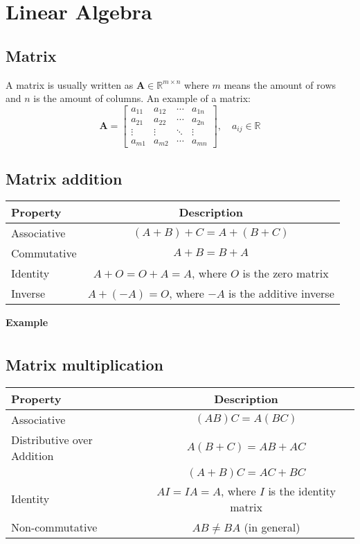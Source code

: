 \section{Linear Algebra}

\subsection{Matrix}
A matrix is usually written as $\mathbf{A} \in \mathbb{R}^{m \times n}$ where $m$ means the amount of rows and $n$ is the amount of columns. An example of a matrix:
$$
\mathbf{A} =
\begin{bmatrix}
    a_{11} & a_{12} & \cdots & a_{1n} \\
    a_{21} & a_{22} & \cdots & a_{2n} \\
    \vdots & \vdots & \ddots & \vdots \\
    a_{m1} & a_{m2} & \cdots & a_{mn}
\end{bmatrix},
\quad a_{ij} \in \mathbb{R}
$$

\subsection{Matrix addition}
\begin{center}
\begin{tabular}{|l|c|}
    \hline
    \textbf{Property} & \textbf{Description} \\ \hline
    Associative & \((A + B) + C = A + (B + C)\) \\ \hline
    Commutative & \(A + B = B + A\) \\ \hline
    Identity & \(A + O = O + A = A\), where \(O\) is the zero matrix \\ \hline
    Inverse & \(A + (-A) = O\), where \(-A\) is the additive inverse \\ \hline
\end{tabular}
\end{center}

\textbf{Example}
\begin{align*}
\end{align*}

\subsection{Matrix multiplication}
\begin{center}
\begin{tabular}{|l|c|}
    \hline
    \textbf{Property} & \textbf{Description} \\ \hline
    Associative & \((AB)C = A(BC)\) \\ \hline
    Distributive over Addition & \(A(B + C) = AB + AC\) \\
                               & \((A + B)C = AC + BC\) \\ \hline
    Identity & \(AI = IA = A\), where \(I\) is the identity matrix \\ \hline
    Non-commutative & \(AB \neq BA\) (in general) \\ \hline
\end{tabular}
\end{center}


